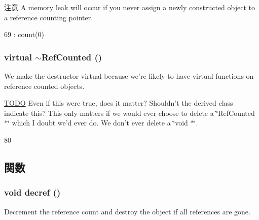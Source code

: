 \begin{DoxyAttention}{注意}
A memory leak will occur if you never assign a newly constructed object to a reference counting pointer. 
\end{DoxyAttention}



\begin{DoxyCode}
69 : count(0) {}
\end{DoxyCode}
\hypertarget{classRefCounted_ae6cca02ff208ebb8704f20b56e6de02b}{
\subsubsection[{$\sim$RefCounted}]{\setlength{\rightskip}{0pt plus 5cm}virtual $\sim${\bf RefCounted} ()}}
\label{classRefCounted_ae6cca02ff208ebb8704f20b56e6de02b}
We make the destructor virtual because we're likely to have virtual functions on reference counted objects.

\begin{Desc}
\item[\hyperlink{todo__todo000008}{TODO}]Even if this were true, does it matter? Shouldn't the derived class indicate this? This only matters if we would ever choose to delete a \char`\"{}RefCounted $\ast$\char`\"{} which I doubt we'd ever do. We don't ever delete a \char`\"{}void $\ast$\char`\"{}. \end{Desc}



\begin{DoxyCode}
80 {}
\end{DoxyCode}


\subsection{関数}
\hypertarget{classRefCounted_a0ff5c4fba5e67643030a3e2f5b70a737}{
\subsubsection[{decref}]{\setlength{\rightskip}{0pt plus 5cm}void decref ()}}
\label{classRefCounted_a0ff5c4fba5e67643030a3e2f5b70a737}
Decrement the reference count and destroy the object if all references are gone. 


